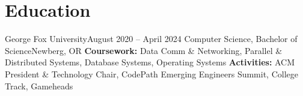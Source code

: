 \section{Education}
  \resumeSubHeadingListStart
    \resumeEducationSubheading
        {George Fox University}{August 2020 -- April 2024}
        {Computer Science, Bachelor of Science}{Newberg, OR}
        {\textbf{Coursework:} Data Comm \& Networking, Parallel \& Distributed Systems, Database Systems, Operating Systems}
        {\textbf{Activities:} ACM President \& Technology Chair, CodePath Emerging Engineers Summit, College Track, Gameheads}
  \resumeSubHeadingListEnd


